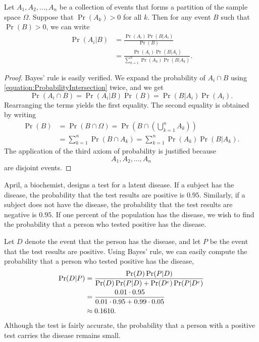 \begin{theorem}
Let $A_1, A_2, \ldots, A_n$ be a collection of events that forms a partition of the sample space $\Omega$.
Suppose that $\Pr (A_k) > 0$ for all $k$.
Then for any event $B$ such that $\Pr (B) > 0$, we can write
\begin{equation*}
\begin{split}
\Pr (A_i | B)
&= \frac{ \Pr (A_i) \Pr (B | A_i) }{ \Pr (B) } \\
&= \frac{ \Pr (A_i) \Pr (B | A_i) }
{ \sum_{k=1}^n \Pr (A_k) \Pr (B | A_k) } .
\end{split}
\end{equation*}
\end{theorem}
\begin{proof}
Bayes' rule is easily verified.
We expand the probability of $A_i \cap B$ using \eqref{equation:ProbabilityIntersection} twice, and we get
\begin{equation*}
\Pr (A_i \cap B) = \Pr (A_i | B) \Pr (B) = \Pr (B | A_i) \Pr (A_i).
\end{equation*}
Rearranging the terms yields the first equality.
The second equality is obtained by writing
\begin{equation*}
\begin{split}
\Pr (B) &= \Pr (B \cap \Omega)
= \Pr \left( B \cap \left( \bigcup_{k=1}^n A_k \right) \right) \\
&= \sum_{k=1}^n \Pr (B \cap A_k)
= \sum_{k=1}^n \Pr (A_k) \Pr (B | A_k) .
\end{split}
\end{equation*}
The application of the third axiom of probability is justified because
\begin{equation*}
A_1, A_2, \ldots, A_n
\end{equation*}
are disjoint events.
\end{proof}

\begin{example}
April, a biochemist, designs a test for a latent disease.
If a subject has the disease, the probability that the test results are positive is $0.95$.
Similarly, if a subject does not have the disease, the probability that the test results are negative is $0.95$.
If one percent of the population has the disease, we wish to find the probability that a person who tested positive has the disease.

Let $D$ denote the event that the person has the disease, and let $P$ be the event that the test results are positive.
Using Bayes' rule, we can easily compute the probability that a person who tested positive has the disease,
\begin{equation*}
\begin{split}
\Pr (D|P)
&= \frac{ \Pr(D) \Pr(P|D) }{ \Pr(D) \Pr(P|D) + \Pr(D^{\mathrm{c}}) \Pr(P|D^{\mathrm{c}}) } \\
&= \frac{ 0.01 \cdot 0.95 }{ 0.01 \cdot 0.95 + 0.99 \cdot 0.05 } \\
&\approx 0.1610 .
\end{split}
\end{equation*}
Although the test is fairly accurate, the probability that a person with a positive test carries the disease remains small.
\end{example}


